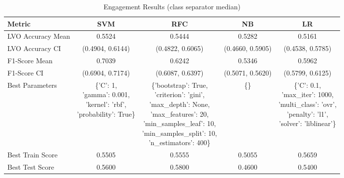 \begin{table}[h!]
\centering
\begin{tabular}{|l|c|c|c|c|}
\hline
\textbf{Metric}           & \textbf{SVM}    & \textbf{RFC}    & \textbf{NB}     & \textbf{LR}     \\ \hline
LVO Accuracy Mean         & 0.5524          & 0.5444          & 0.5282          & 0.5161          \\ \hline
LVO Accuracy CI           & (0.4904, 0.6144)& (0.4822, 0.6065)& (0.4660, 0.5905)& (0.4538, 0.5785)\\ \hline
F1-Score Mean             & 0.7039          & 0.6242          & 0.5346          & 0.5962          \\ \hline
F1-Score CI               & (0.6904, 0.7174)& (0.6087, 0.6397)& (0.5071, 0.5620)& (0.5799, 0.6125)\\ \hline
Best Parameters           & \makecell[l]{\{'C': 1,\\ 'gamma': 0.001,\\ 'kernel': 'rbf',\\ 'probability': True\}} & \makecell[l]{\{'bootstrap': True,\\ 'criterion': 'gini',\\ 'max\_depth': None,\\ 'max\_features': 20,\\ 'min\_samples\_leaf': 10, \\'min\_samples\_split': 10,\\ 'n\_estimators': 400\}} & \{\} & \makecell[l]{\{'C': 0.1,\\ 'max\_iter': 1000,\\ 'multi\_class': 'ovr',\\ 'penalty': 'l1',\\ 'solver': 'liblinear'\}} \\ \hline
Best Train Score          & 0.5505          & 0.5555          & 0.5055          & 0.5659          \\ \hline
Best Test Score           & 0.5600          & 0.5800          & 0.4600          & 0.5400          \\ \hline
\end{tabular}
\caption{Engagement Results (class separator median)}
\label{table:engagement}
\end{table}
